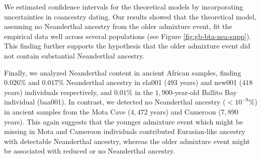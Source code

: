 We estimated confidence intervals for the theoretical models by incorporating uncertainties in coancestry dating. Our results showed that the theoretical model, assuming no Neanderthal ancestry from the older admixture event, fit the empirical data well across several populations (see Figure \ref{fig:gb-bta-nea-supp}). This finding further supports the hypothesis that the older admixture event did not contain substantial Neanderthal ancestry. 

Finally, we analyzed Neanderthal content in ancient African samples, finding \( 0.026\% \) and \( 0.017\% \) Neanderthal ancestry in ela001 ($493$ years) and new001 ($418$ years) individuals respectively, and \( 0.01\% \) in the $1{,}900$-year-old Ballito Bay individual (baa001). In contrast, we detected no Neanderthal ancestry (\(<10^{-9}\%\)) in ancient samples from the Mota Cave ($4{,}472$ years) and Cameroon ($7{,}890$ years). This again suggests that the younger admixture event which might be missing in Mota and Cameroon individuals contributed Eurasian-like ancestry with detectable Neanderthal ancestry, whereas the older admixture event might be associated with reduced or no Neanderthal ancestry.

